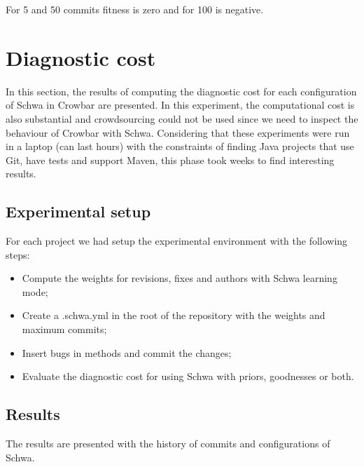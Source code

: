 For 5 and 50 commits fitness is zero and for 100 is negative.

\section{Diagnostic cost}
In this section, the results of computing the diagnostic cost for each configuration of Schwa in Crowbar are presented. In this experiment, the computational cost is also substantial and crowdsourcing could not be used since we need to inspect the behaviour of Crowbar with Schwa. Considering that these experiments were run in a laptop (can last hours) with the constraints of finding Java projects that use Git, have tests and support Maven, this phase took weeks to find interesting results.

\subsection{Experimental setup}
For each project we had setup the experimental environment with the following steps:

\begin{itemize}
\item Compute the weights for revisions, fixes and authors with Schwa learning mode;
\item Create a .schwa.yml in the root of the repository with the weights and maximum commits;
\item Insert bugs in methods and commit the changes;
\item Evaluate the diagnostic cost for using Schwa with priors, goodnesses or both.
\end{itemize}


\subsection{Results}
The results are presented with the history of commits and configurations of Schwa.

